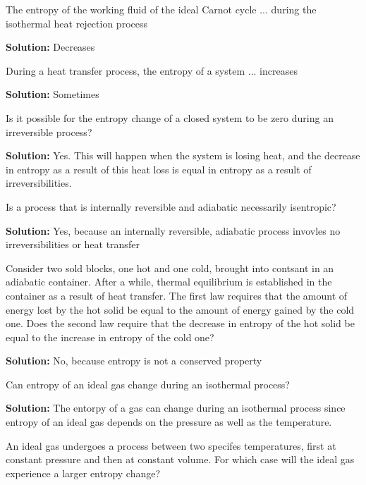 \begin{list}{\bf Question :~}{}
%
     \item\label{Q42} The entropy of the working fluid of the ideal Carnot cycle ... during the isothermal heat rejection process
%

       {\bf Solution:} Decreases

%
     \item\label{Q43} During a heat transfer process, the entropy of a system ... increases
%

       {\bf Solution:} Sometimes

%
     \item\label{Q44} Is it possible for the entropy change of a closed system to be zero during an irreversible process?
%

       {\bf Solution:} Yes. This will happen when the system is losing heat, and the decrease in entropy as a result of this heat loss is equal in entropy as a result of irreversibilities.

%
     \item\label{Q45} Is a process that is internally reversible and adiabatic necessarily isentropic? 
%

       {\bf Solution:} Yes, because an internally reversible, adiabatic process invovles no irreversibilities or heat transfer
%
     \item\label{Q46} Consider two sold blocks, one hot and one cold, brought into contsant in an adiabatic container. After a while, thermal equilibrium is established in the container as a result of heat transfer. The first law requires that the amount of energy lost by the hot solid be equal to the amount of energy gained by the cold one. Does the second law require that the decrease in entropy of the hot solid be equal to the increase in entropy of the cold one?
%

       {\bf Solution:} No, because entropy is not a conserved property

%
     \item\label{Q47} Can entropy of an ideal gas change during an isothermal process? 
%

       {\bf Solution:} The entorpy of a gas can change during an isothermal process since entropy of an ideal gas depends on the pressure as well as the temperature.

%
     \item\label{Q48} An ideal gas undergoes a process between two specifes temperatures, first at constant pressure and then at constant volume. For which case will the ideal gas experience a larger entropy change? 
%


\end{list}
